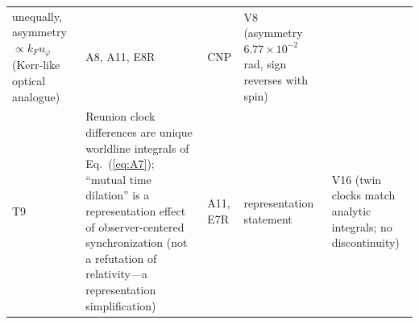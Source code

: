 \documentclass[aps,reprint,amsmath,amssymb,nofootinbib,superscriptaddress,floatfix]{revtex4-2}
\begin{document}
\begin{table}[t]
\begin{ruledtabular}
\begin{tabular}{lp{}p{}p{}p{}}
unequally, asymmetry $\propto k_F u_\varphi$ (Kerr-like optical
analogue) & A8, A11, E8R & CNP & V8 (asymmetry
$6.77\times10^{-2}$ rad, sign reverses with spin) \\
T9 & Reunion clock differences are unique worldline integrals of
Eq.~(\ref{eq:A7}); ``mutual time dilation'' is a representation
effect of observer-centered synchronization (not a refutation of
relativity---a representation simplification) & A11, E7R &
representation statement & V16 (twin clocks match analytic
integrals; no discontinuity) \\
\end{tabular}
\end{ruledtabular}
\end{table}

\end{document}
